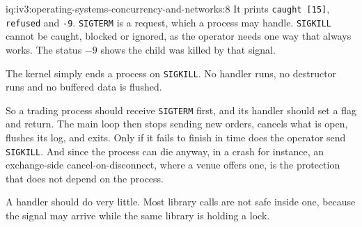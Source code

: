 \begin{solution}{iq:iv3:operating-systems-concurrency-and-networks:8}
It prints \texttt{caught [15]}, \texttt{refused} and \texttt{-9}. \texttt{SIGTERM} is a request, which a process may handle. \texttt{SIGKILL} cannot be caught, blocked or ignored, as the operator needs one way that always works. The status $-9$ shows the child was killed by that signal.

The kernel simply ends a process on \texttt{SIGKILL}. No handler runs, no destructor runs and no buffered data is flushed.

So a trading process should receive \texttt{SIGTERM} first, and its handler should set a flag and return. The main loop then stops sending new orders, cancels what is open, flushes its log, and exits. Only if it fails to finish in time does the operator send \texttt{SIGKILL}. And since the process can die anyway, in a crash for instance, an exchange-side cancel-on-disconnect, where a venue offers one, is the protection that does not depend on the process.

A handler should do very little. Most library calls are not safe inside one, because the signal may arrive while the same library is holding a lock.

\end{solution}

